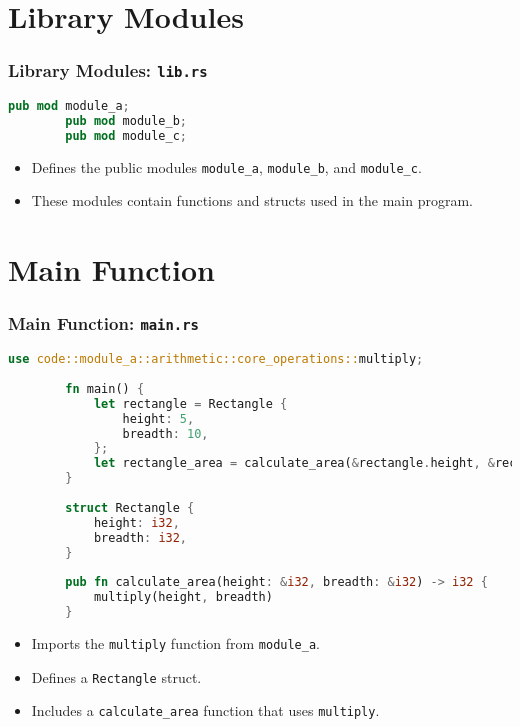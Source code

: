 \documentclass[aspectratio=169, table]{beamer}
\begin{document}
\section{Library Modules}
\begin{frame}[fragile]
	\frametitle{Library Modules: \texttt{lib.rs}}
	\begin{lstlisting}[language=Rust]
		pub mod module_a;
		pub mod module_b;
		pub mod module_c;
	\end{lstlisting}
	\begin{itemize}
		\item Defines the public modules \texttt{module\_a}, \texttt{module\_b}, and \texttt{module\_c}.
		\item These modules contain functions and structs used in the main program.
	\end{itemize}
\end{frame}

\section{Main Function}
\begin{frame}[fragile]
	\frametitle{Main Function: \texttt{main.rs}}
	\begin{lstlisting}[language=Rust]
		use code::module_a::arithmetic::core_operations::multiply;
		
		fn main() {
			let rectangle = Rectangle {
				height: 5,
				breadth: 10,
			};
			let rectangle_area = calculate_area(&rectangle.height, &rectangle.breadth);
		}
		
		struct Rectangle {
			height: i32,
			breadth: i32,
		}
		
		pub fn calculate_area(height: &i32, breadth: &i32) -> i32 {
			multiply(height, breadth)
		}
	\end{lstlisting}
	\begin{itemize}
		\item Imports the \texttt{multiply} function from \texttt{module\_a}.
		\item Defines a \texttt{Rectangle} struct.
		\item Includes a \texttt{calculate\_area} function that uses \texttt{multiply}.
	\end{itemize}
\end{frame}
\end{document}

